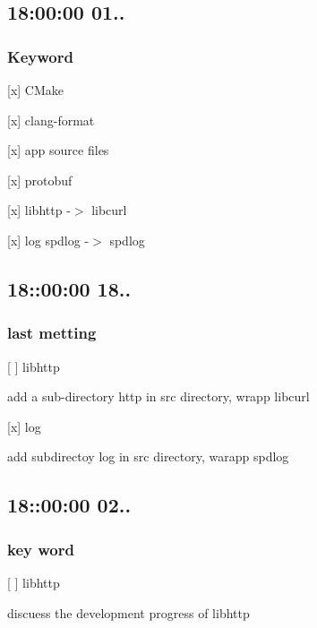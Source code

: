 \subsection*{18\+:00\+:00 01..}

\subsubsection*{Keyword}


\begin{DoxyItemize}
\item \mbox{[}x\mbox{]} C\+Make
\item \mbox{[}x\mbox{]} clang-\/format
\item \mbox{[}x\mbox{]} app source files
\item \mbox{[}x\mbox{]} protobuf
\item \mbox{[}x\mbox{]} libhttp -\/$>$ libcurl
\item \mbox{[}x\mbox{]} log spdlog -\/$>$ spdlog
\end{DoxyItemize}

\subsection*{18\+:\+:00\+:00 18..}

\subsubsection*{last metting}


\begin{DoxyItemize}
\item \mbox{[} \mbox{]} libhttp

add a sub-\/directory {\ttfamily http} in {\ttfamily src} directory, wrapp {\ttfamily libcurl}
\item \mbox{[}x\mbox{]} log

add subdirectoy \textquotesingle{}log\textquotesingle{} in {\ttfamily src} directory, warapp {\ttfamily spdlog}
\end{DoxyItemize}

\subsection*{18\+:\+:00\+:00 02..}

\subsubsection*{key word}


\begin{DoxyItemize}
\item \mbox{[} \mbox{]} libhttp

discuess the development progress of {\ttfamily libhttp} 
\end{DoxyItemize}